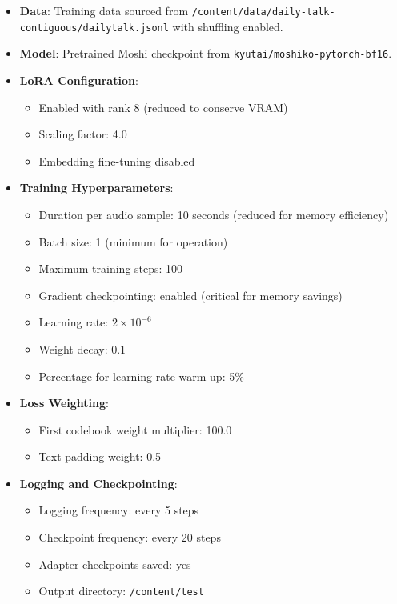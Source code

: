 \documentclass[12pt,a4paper]{article}
\begin{document}
\begin{itemize}[leftmargin=1.5em]
    \item \textbf{Data}: Training data sourced from \texttt{/content/data/daily-talk-contiguous/dailytalk.jsonl} with shuffling enabled.
    \item \textbf{Model}: Pretrained Moshi checkpoint from \texttt{kyutai/moshiko-pytorch-bf16}.
    \item \textbf{LoRA Configuration}: 
    \begin{itemize}[leftmargin=1.5em]
        \item Enabled with rank 8 (reduced to conserve VRAM)
        \item Scaling factor: 4.0
        \item Embedding fine-tuning disabled
    \end{itemize}
    \item \textbf{Training Hyperparameters}:
    \begin{itemize}[leftmargin=1.5em]
        \item Duration per audio sample: 10 seconds (reduced for memory efficiency)
        \item Batch size: 1 (minimum for operation)
        \item Maximum training steps: 100
        \item Gradient checkpointing: enabled (critical for memory savings)
        \item Learning rate: $2 \times 10^{-6}$
        \item Weight decay: 0.1
        \item Percentage for learning-rate warm-up: 5\%
    \end{itemize}
    \item \textbf{Loss Weighting}:
    \begin{itemize}[leftmargin=1.5em]
        \item First codebook weight multiplier: 100.0
        \item Text padding weight: 0.5
    \end{itemize}
    \item \textbf{Logging and Checkpointing}:
    \begin{itemize}[leftmargin=1.5em]
        \item Logging frequency: every 5 steps
        \item Checkpoint frequency: every 20 steps
        \item Adapter checkpoints saved: yes
        \item Output directory: \texttt{/content/test}
    \end{itemize}
\end{itemize}
\end{document}
